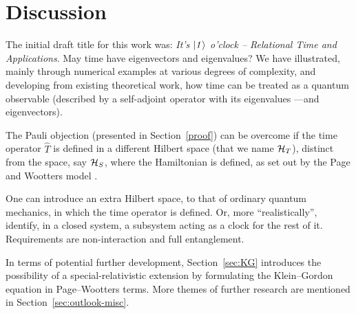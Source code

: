\section{Discussion}

The initial draft title for this work was:
\textit{It's $\it\ket{1}$ o'clock -- Relational Time and Applications}.
May time have eigenvectors and eigenvalues?
We have illustrated,
mainly through numerical examples
at various degrees of complexity,
and developing from existing theoretical work,
how time can be treated as a quantum observable
(described by a self-adjoint operator with its eigenvalues ---and eigenvectors).

The Pauli objection (presented in Section~\ref{proof})
can be overcome if the time operator $\hat{T}$
is defined in a different Hilbert space (that we name $\mathcal{H}_T$),
distinct from
the space, say $\mathcal{H}_S$, where the Hamiltonian is defined,
as set out by the Page and Wootters model
\parencite{PageWootters, Lloyd:Time, Marletto:Evolution, Maccone:QMOT, Maccone:Pauli}.

One can introduce an extra Hilbert space, to that of ordinary quantum mechanics,
in which the time operator is defined.
Or, more ``realistically'', identify, in a closed system, a subsystem
acting as a clock for the rest of it. Requirements are non-interaction and
full entanglement.

In terms of potential further development,
Section~\ref{sec:KG} introduces the possibility of a special-relativistic extension
by formulating the Klein--Gordon equation in Page--Wootters terms.
More themes of further research are mentioned in Section~\ref{sec:outlook-misc}.




